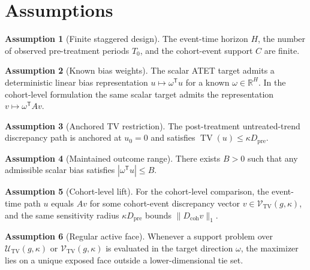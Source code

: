 \documentclass[11pt]{article}
\newcommand{\transpose}{\mathsf{T}}
\newcommand{\R}{\mathbb{R}}
\theoremstyle{definition}
\newtheorem{assumption}{Assumption}
\theoremstyle{plain}
\theoremstyle{remark}
\begin{document}
\section{Assumptions}
\begin{assumption}[Finite staggered design]\label{ass:finite}
The event-time horizon \(H\), the number of observed pre-treatment periods \(T_0\), and the cohort-event support \(C\) are finite.
\end{assumption}

\begin{assumption}[Known bias weights]\label{ass:weights}
The scalar ATET target admits a deterministic linear bias representation \(u\mapsto \omega^\transpose u\) for a known \(\omega\in\R^H\). In the cohort-level formulation the same scalar target admits the representation \(v\mapsto \omega^\transpose Av\).
\end{assumption}

\begin{assumption}[Anchored TV restriction]\label{ass:tv}
The post-treatment untreated-trend discrepancy path is anchored at \(u_0=0\) and satisfies \(\operatorname{TV}(u)\le \kappa D_{\mathrm{pre}}\).
\end{assumption}

\begin{assumption}[Maintained outcome range]\label{ass:range}
There exists \(B>0\) such that any admissible scalar bias satisfies \(|\omega^\transpose u|\le B\).
\end{assumption}

\begin{assumption}[Cohort-level lift]\label{ass:cohort}
For the cohort-level comparison, the event-time path \(u\) equals \(Av\) for some cohort-event discrepancy vector \(v\in\mathcal V_{\mathrm{TV}}(g,\kappa)\), and the same sensitivity radius \(\kappa D_{\mathrm{pre}}\) bounds \(\|D_{\mathrm{coh}}v\|_1\).
\end{assumption}

\begin{assumption}[Regular active face]\label{ass:face}
Whenever a support problem over \(\mathcal U_{\mathrm{TV}}(g,\kappa)\) or \(\mathcal V_{\mathrm{TV}}(g,\kappa)\) is evaluated in the target direction \(\omega\), the maximizer lies on a unique exposed face outside a lower-dimensional tie set.
\end{assumption}
\end{document}
